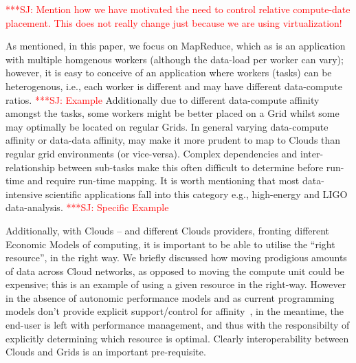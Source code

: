 \documentclass[conference,final]{IEEEtran}
\newcommand{\jhanote}[1]{ {\textcolor{red} { ***SJ: #1 }}}
\newcommand{\jhanote}[1]{}
\begin{document}
\jhanote{Mention how we have motivated the need to control
  relative compute-date placement. This does not really change
  just because we are using virtualization!}


As mentioned, in this paper, we focus on MapReduce, which as is an
application with multiple homgenous workers (although the data-load
per worker can vary); however, it is easy to conceive of an
application where workers (tasks) can be heterogenous, i.e., each
worker is different and may have different data-compute ratios.
\jhanote{Example} Additionally due to different data-compute affinity
amongst the tasks, some workers might be better placed on a Grid
whilst some may optimally be located on regular Grids.  In general
varying data-compute affinity or data-data affinity, may make it more
prudent to map to Clouds than regular grid environments (or
vice-versa).  Complex dependencies and inter-relationship between
sub-tasks make this often difficult to determine before run-time and
require run-time mapping. It is worth mentioning that most
data-intensive scientific applications fall into this category e.g.,
high-energy and LIGO data-analysis.  \jhanote{Specific Example}

Additionally, with Clouds -- and different Clouds providers, fronting
different Economic Models of computing, it is important to be able to
utilise the ``right resource'', in the right way. We briefly discussed
how moving prodigious amounts of data across Cloud networks, as
opposed to moving the compute unit could be expensive; this is an
example of using a given resource in the right-way. However in the
absence of autonomic performance models and as current programming
models don't provide explicit support/control for
affinity~\cite{jha_ccpe09}, in the meantime, the end-user is left with
performance management, and thus with the responsibilty of explicitly
determining which resource is optimal. Clearly interoperability
between Clouds and Grids is an important pre-requisite.

\end{document}
